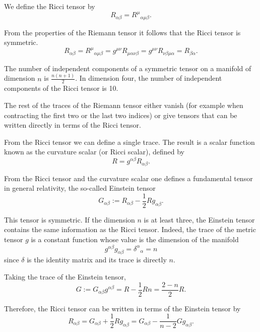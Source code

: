\begin{points}
\item We define the Ricci tensor by
\[
  R_{\alpha\beta}=R^\mu{}_{\alpha\mu\beta} .
\]

\item From the properties of the Riemann tensor it follows that the Ricci tensor is symmetric.
\[
  R_{\alpha\beta}=R^\mu{}_{\alpha\mu\beta}=g^{\mu\nu}R_{\mu\alpha\nu\beta}=g^{\mu\nu}R_{\nu\beta\mu\alpha}=R_{\beta\alpha} .
\]

\item The number of independent components of a symmetric tensor on a manifold of dimension $n$ is $\frac{n(n+1)}{2}$. In dimension four, the number of independent components of the Ricci tensor is 10.

\item The rest of the traces of the Riemann tensor either vanish (for example when contracting the first two or the last two indices) or give tensors that can be written directly in terms of the Ricci tensor.

\item From the Ricci tensor we can define a single trace. The result is a scalar function known as the curvature scalar (or Ricci scalar), defined by
\[
  R=g^{\alpha\beta}R_{\alpha\beta} .
\]

\item From the Ricci tensor and the curvature scalar one defines a fundamental tensor in general relativity, the so-called Einstein tensor
\[
  G_{\alpha\beta}:=R_{\alpha\beta}-\frac12Rg_{\alpha\beta} .
\]

\item This tensor is symmetric. If the dimension $n$ is at least three, the Einstein tensor contains the same information as the Ricci tensor. Indeed, the trace of the metric tensor $g$ is a constant function whose value is the dimension of the manifold
\[
  g^{\alpha\beta}g_{\alpha\beta}=\delta^\alpha{}_\alpha=n
\]
since $\delta$ is the identity matrix and its trace is directly $n$.

\item Taking the trace of the Einstein tensor,
\[
  G:=G_{\alpha\beta}g^{\alpha\beta}=R-\frac12Rn=\frac{2-n}{2}R .
\]

\item Therefore, the Ricci tensor can be written in terms of the Einstein tensor by
\[
  R_{\alpha\beta}=G_{\alpha\beta}+\frac12Rg_{\alpha\beta}=G_{\alpha\beta}-\frac{1}{n-2}Gg_{\alpha\beta} .
\]


\end{points}
